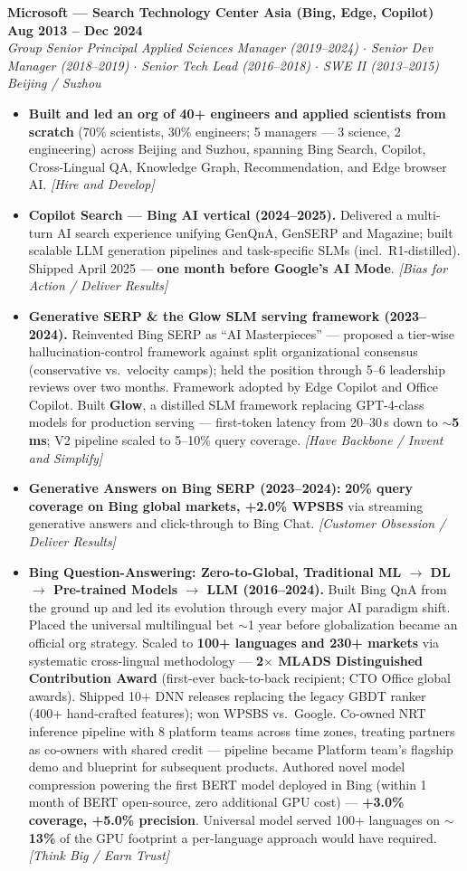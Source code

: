 \documentclass[10.5pt,letterpaper]{article}
\newcommand{\role}[4]{%
  \noindent\textbf{#1} \hfill \textbf{#3}\\
  \textit{#2} \hfill \textit{#4}\par\vspace{2pt}}
\newcommand{\lp}[1]{\textcolor{blue!55!black}{\small\textit{[#1]}}}
\begin{document}
\vspace{4pt}
\role{Microsoft --- Search Technology Center Asia (Bing, Edge, Copilot)}{Group Senior Principal Applied Sciences Manager (2019--2024) $\cdot$ Senior Dev Manager (2018--2019) $\cdot$ Senior Tech Lead (2016--2018) $\cdot$ SWE II (2013--2015)}{Aug 2013 -- Dec 2024}{Beijing / Suzhou}
\begin{itemize}
  \item \textbf{Built and led an org of 40+ engineers and applied scientists from scratch} (70\% scientists, 30\% engineers; 5 managers --- 3 science, 2 engineering) across Beijing and Suzhou, spanning Bing Search, Copilot, Cross-Lingual QA, Knowledge Graph, Recommendation, and Edge browser AI. \lp{Hire and Develop}
  \item \textbf{Copilot Search --- Bing AI vertical (2024--2025).} Delivered a multi-turn AI search experience unifying GenQnA, GenSERP and Magazine; built scalable LLM generation pipelines and task-specific SLMs (incl.\ R1-distilled). Shipped April 2025 --- \textbf{one month before Google's AI Mode}. \lp{Bias for Action / Deliver Results}
  \item \textbf{Generative SERP \& the Glow SLM serving framework (2023--2024).} Reinvented Bing SERP as ``AI Masterpieces'' --- proposed a tier-wise hallucination-control framework against split organizational consensus (conservative vs.\ velocity camps); held the position through 5--6 leadership reviews over two months. Framework adopted by Edge Copilot and Office Copilot. Built \textbf{Glow}, a distilled SLM framework replacing GPT-4-class models for production serving --- first-token latency from 20--30\,s down to \textbf{$\sim$5\,ms}; V2 pipeline scaled to 5--10\% query coverage. \lp{Have Backbone / Invent and Simplify}
  \item \textbf{Generative Answers on Bing SERP (2023--2024):} \textbf{20\% query coverage on Bing global markets, +2.0\% WPSBS} via streaming generative answers and click-through to Bing Chat. \lp{Customer Obsession / Deliver Results}
  \item \textbf{Bing Question-Answering: Zero-to-Global, Traditional ML $\to$ DL $\to$ Pre-trained Models $\to$ LLM (2016--2024).} Built Bing QnA from the ground up and led its evolution through every major AI paradigm shift. Placed the universal multilingual bet $\sim$1 year before globalization became an official org strategy. Scaled to \textbf{100+ languages and 230+ markets} via systematic cross-lingual methodology --- \textbf{2$\times$ MLADS Distinguished Contribution Award} (first-ever back-to-back recipient; CTO Office global awards). Shipped 10+ DNN releases replacing the legacy GBDT ranker (400+ hand-crafted features); won WPSBS vs.\ Google. Co-owned NRT inference pipeline with 8 platform teams across time zones, treating partners as co-owners with shared credit --- pipeline became Platform team's flagship demo and blueprint for subsequent products. Authored novel model compression powering the first BERT model deployed in Bing (within 1 month of BERT open-source, zero additional GPU cost) --- \textbf{+3.0\% coverage, +5.0\% precision}. Universal model served 100+ languages on \textbf{$\sim$13\%} of the GPU footprint a per-language approach would have required. \lp{Think Big / Earn Trust}

\end{itemize}
\end{document}

